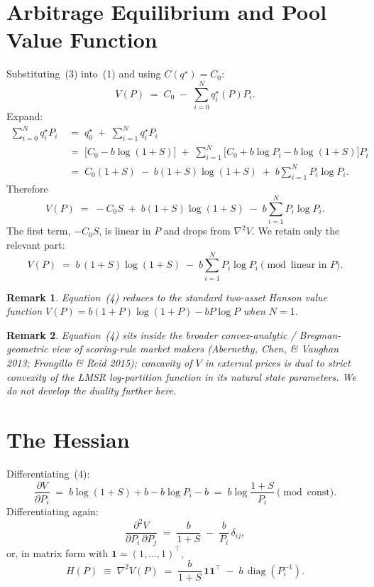 \documentclass[11pt]{article}
\newtheorem*{remark}{Remark}
\DeclareMathOperator{\diag}{diag}
\newcommand{\one}{\mathbf{1}}
\newcommand{\transp}{^{\!\top}}
\begin{document}
\section{Arbitrage Equilibrium and Pool Value Function}\label{sec:value}

Substituting~(3) into~(1) and using $C(q^\star) = C_0$:
\[
V(P) \;=\; C_0 \;-\; \sum_{i=0}^N q_i^\star(P) P_i.
\]
Expand:
\begin{align*}
\sum_{i=0}^N q_i^\star P_i
&\;=\; q_0^\star \;+\; \sum_{i=1}^N q_i^\star P_i \\
&\;=\; \bigl[C_0 - b\log(1+S)\bigr] \;+\; \sum_{i=1}^N\bigl[C_0 + b\log P_i - b\log(1+S)\bigr] P_i \\
&\;=\; C_0(1+S) \;-\; b(1+S)\log(1+S) \;+\; b\sum_{i=1}^N P_i \log P_i.
\end{align*}
Therefore
\[
V(P) \;=\; -C_0 S \;+\; b(1+S)\log(1+S) \;-\; b\sum_{i=1}^N P_i \log P_i.
\]
The first term, $-C_0 S$, is linear in $P$ and drops from $\nabla^2 V$. We retain only the relevant part:
\begin{equation*}
\boxed{\;\; V(P) \;=\; b\,(1+S)\log(1+S) \;-\; b\sum_{i=1}^N P_i \log P_i \pmod{\text{linear in }P}. \;\;} \tag{4}
\end{equation*}

\begin{remark}
Equation~(4) reduces to the standard two-asset Hanson value function $V(P) = b(1+P)\log(1+P) - bP\log P$ when $N = 1$.
\end{remark}

\begin{remark}
Equation~(4) sits inside the broader convex-analytic / Bregman-geometric view of scoring-rule market makers (Abernethy, Chen, \& Vaughan 2013; Frongillo \& Reid 2015); concavity of $V$ in external prices is dual to strict convexity of the LMSR log-partition function in its natural state parameters. We do not develop the duality further here.
\end{remark}

\section{The Hessian}\label{sec:hessian}

Differentiating~(4):
\begin{equation*}
\frac{\partial V}{\partial P_i} \;=\; b\log(1+S) + b - b\log P_i - b \;=\; b\log\!\frac{1+S}{P_i} \pmod{\text{const}}. \tag{5}
\end{equation*}
Differentiating again:
\[
\frac{\partial^2 V}{\partial P_i\,\partial P_j} \;=\; \frac{b}{1+S} \;-\; \frac{b}{P_i}\,\delta_{ij},
\]
or, in matrix form with $\one = (1, \dots, 1)\transp$,
\begin{equation*}
\boxed{\;\; H(P) \;\equiv\; \nabla^2 V(P) \;=\; \frac{b}{1+S}\,\one\one\transp \;-\; b\,\diag(P_i^{-1}). \;\;} \tag{6}
\end{equation*}
\end{document}
